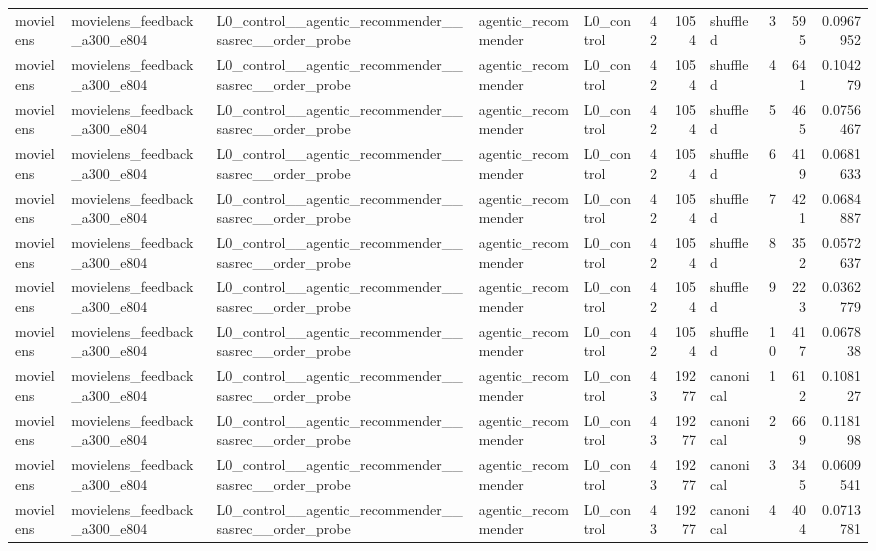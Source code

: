 \begin{table}[htbp!]
\begin{tabular}{lllllrrlrrr}
movielens & movielens\_feedback\_a300\_e804 & L0\_control\_\_agentic\_recommender\_\_sasrec\_\_order\_probe & agentic\_recommender & L0\_control & 42 & 1054 & shuffled & 3 & 595 & 0.0967952 \\
movielens & movielens\_feedback\_a300\_e804 & L0\_control\_\_agentic\_recommender\_\_sasrec\_\_order\_probe & agentic\_recommender & L0\_control & 42 & 1054 & shuffled & 4 & 641 & 0.104279 \\
movielens & movielens\_feedback\_a300\_e804 & L0\_control\_\_agentic\_recommender\_\_sasrec\_\_order\_probe & agentic\_recommender & L0\_control & 42 & 1054 & shuffled & 5 & 465 & 0.0756467 \\
movielens & movielens\_feedback\_a300\_e804 & L0\_control\_\_agentic\_recommender\_\_sasrec\_\_order\_probe & agentic\_recommender & L0\_control & 42 & 1054 & shuffled & 6 & 419 & 0.0681633 \\
movielens & movielens\_feedback\_a300\_e804 & L0\_control\_\_agentic\_recommender\_\_sasrec\_\_order\_probe & agentic\_recommender & L0\_control & 42 & 1054 & shuffled & 7 & 421 & 0.0684887 \\
movielens & movielens\_feedback\_a300\_e804 & L0\_control\_\_agentic\_recommender\_\_sasrec\_\_order\_probe & agentic\_recommender & L0\_control & 42 & 1054 & shuffled & 8 & 352 & 0.0572637 \\
movielens & movielens\_feedback\_a300\_e804 & L0\_control\_\_agentic\_recommender\_\_sasrec\_\_order\_probe & agentic\_recommender & L0\_control & 42 & 1054 & shuffled & 9 & 223 & 0.0362779 \\
movielens & movielens\_feedback\_a300\_e804 & L0\_control\_\_agentic\_recommender\_\_sasrec\_\_order\_probe & agentic\_recommender & L0\_control & 42 & 1054 & shuffled & 10 & 417 & 0.067838 \\
movielens & movielens\_feedback\_a300\_e804 & L0\_control\_\_agentic\_recommender\_\_sasrec\_\_order\_probe & agentic\_recommender & L0\_control & 43 & 19277 & canonical & 1 & 612 & 0.108127 \\
movielens & movielens\_feedback\_a300\_e804 & L0\_control\_\_agentic\_recommender\_\_sasrec\_\_order\_probe & agentic\_recommender & L0\_control & 43 & 19277 & canonical & 2 & 669 & 0.118198 \\
movielens & movielens\_feedback\_a300\_e804 & L0\_control\_\_agentic\_recommender\_\_sasrec\_\_order\_probe & agentic\_recommender & L0\_control & 43 & 19277 & canonical & 3 & 345 & 0.0609541 \\
movielens & movielens\_feedback\_a300\_e804 & L0\_control\_\_agentic\_recommender\_\_sasrec\_\_order\_probe & agentic\_recommender & L0\_control & 43 & 19277 & canonical & 4 & 404 & 0.0713781 \\

\end{tabular}
\end{table}
